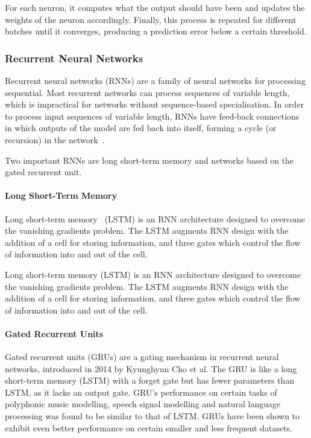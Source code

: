 For each neuron, it computes what the output should have been and updates the weights of the neuron accordingly.
Finally, this process is repeated for different batches until it converges, producing a prediction error below a certain threshold.

\subsubsection{Recurrent Neural Networks}

Recurrent neural networks (RNNs) are a family of neural networks for processing sequential.
Most recurrent networks can process sequences of variable length, which is impractical for networks without sequence-based specialisation.
In order to process input sequences of variable length, RNNs have feed-back connections in which outputs of the model are fed back into itself, forming a cycle (or recursion) in the network~\cite{goodfellow16}.

Two important RNNs are long short-term memory and networks based on the gated recurrent unit.

\paragraph{Long Short-Term Memory}

Long short-term memory~\cite{Graves12} (LSTM) is an RNN architecture designed to overcome the vanishing gradients problem.
The LSTM augments RNN design with the addition of a cell for storing information, and three gates which control the flow of information into and out of the cell.

Long short-term memory (LSTM) is an RNN architecture designed to overcome the vanishing gradients problem.
The LSTM augments RNN design with the addition of a cell for storing information, and three gates which control the flow of information into and out of the cell.

\paragraph{Gated Recurrent Units}

Gated recurrent units (GRUs) are a gating mechanism in recurrent neural networks, introduced in 2014 by Kyunghyun Cho et al. The GRU is like a long short-term memory (LSTM) with a forget gate but has fewer parameters than LSTM, as it lacks an output gate. GRU's performance on certain tasks of polyphonic music modelling, speech signal modelling and natural language processing was found to be similar to that of LSTM. GRUs have been shown to exhibit even better performance on certain smaller and less frequent datasets.

